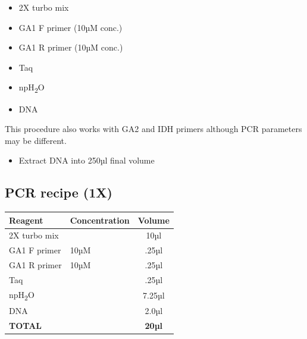 \documentclass[
  letterpaper,
  DIV=11,
  numbers=noendperiod]{scrreprt}
\providecommand{\tightlist}{%
  \setlength{\itemsep}{0pt}\setlength{\parskip}{0pt}}\usepackage{longtable,booktabs,array}
\begin{document}
\begin{itemize}
\tightlist
\item
  2X turbo mix
\item
  GA1 F primer (10µM conc.)
\item
  GA1 R primer (10µM conc.)
\item
  Taq
\item
  npH\textsubscript{2}O
\item
  DNA
\end{itemize}

\begin{tcolorbox}[enhanced jigsaw, rightrule=.15mm, title=\textcolor{quarto-callout-note-color}{\faInfo}\hspace{0.5em}{Other primer pairs that can be used}, titlerule=0mm, opacitybacktitle=0.6, toprule=.15mm, bottomrule=.15mm, opacityback=0, left=2mm, colframe=quarto-callout-note-color-frame, breakable, coltitle=black, colback=white, colbacktitle=quarto-callout-note-color!10!white, bottomtitle=1mm, leftrule=.75mm, toptitle=1mm, arc=.35mm]

This procedure also works with GA2 and IDH primers although PCR
parameters may be different.

\end{tcolorbox}

\begin{itemize}
\tightlist
\item
  Extract DNA into 250µl final volume
\end{itemize}

\hypertarget{pcr-recipe-1x}{%
\subsection{PCR recipe (1X)}\label{pcr-recipe-1x}}

\begin{longtable}[]{@{}llc@{}}
\toprule\noalign{}
Reagent & Concentration & Volume \\
\midrule\noalign{}
\endhead
\bottomrule\noalign{}
\endlastfoot
2X turbo mix & & 10µl \\
GA1 F primer & 10µM & .25µl \\
GA1 R primer & 10µM & .25µl \\
Taq & & .25µl \\
npH\textsubscript{2}O & & 7.25µl \\
DNA & & 2.0µl \\
\textbf{TOTAL} & & \textbf{20µl} \\
\end{longtable}
\end{document}
